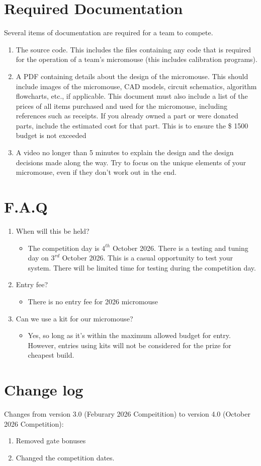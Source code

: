 \documentclass[a4paper,12pt]{article}
\begin{document}
\newpage
\section{Required Documentation} \label{documentation}
Several items of documentation are required for a team to compete.
\begin{enumerate}
    \item The source code. This includes the files containing any code that is required for the operation of a team's micromouse (this includes calibration programs).
    \item A PDF containing details about the design of the micromouse. This should include images of the micromouse, CAD models, circuit schematics, algorithm flowcharts, etc., if applicable. 
    This document must also include a list of the prices of all items purchased and used for the micromouse, including references such as receipts. If you already owned a part or were donated parts, include the estimated cost for that part. This is to ensure the \$ 1500 budget is not exceeded
    \item A video no longer than 5 minutes to explain the design and the design decisions made along the way. Try to focus on the unique elements of your micromouse, even if they don't work out in the end.
\end{enumerate}

\newpage
\section{F.A.Q}
\begin{enumerate}
    \item When will this be held?
    \begin{itemize}
	\item The competition day is $4^{th}$ October 2026. There is a testing and tuning day on $3^{rd}$ October 2026. This is a casual opportunity to test your system. There will be limited time for testing during the competition day.
    \end{itemize}
    \item Entry fee?
    \begin{itemize}
        \item There is no entry fee for 2026 micromouse
    \end{itemize}
    \item Can we use a kit for our micromouse?
    \begin{itemize}
        \item Yes, so long as it's within the maximum allowed budget for entry. However, entries using kits will not be considered for the prize for cheapest build.
    \end{itemize}
\end{enumerate}

\newpage
\section{Change log}

Changes from version 3.0 (Feburary 2026 Compeitition) to version 4.0 (October 2026 Competition):
\begin{enumerate}
    \item Removed gate bonuses
    \item Changed the competition dates.
\end{enumerate}
\end{document}
